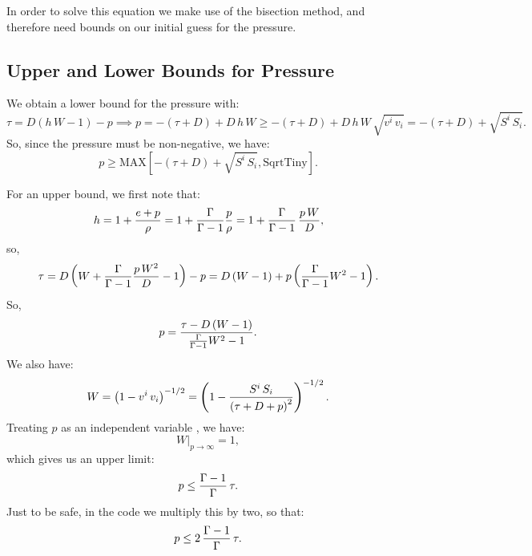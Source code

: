 \documentclass[10pt,preprint]{aastex}
\begin{document}
In order to solve this equation we make use of the bisection method, and therefore need bounds on our initial guess for the pressure.

\subsection{Upper and Lower Bounds for Pressure}
We obtain a lower bound for the pressure with:
\begin{equation}
\tau=D\left(h\,W-1\right)-p\implies p=-\left(\tau+D\right)+D\,h\,W\geq-\left(\tau+D\right)+D\,h\,W\,\sqrt{v^{i}\,v_{i}}=-\left(\tau+D\right)+\sqrt{S^{i}\,S_{i}}.
\end{equation}
So, since the pressure must be non-negative, we have:
\begin{equation}
p\geq\text{MAX}\left[-\left(\tau+D\right)+\sqrt{S^{i}\,S_{i}},\text{SqrtTiny}\right].
\end{equation}

For an upper bound, we first note that:
\begin{equation}
h=1+\frac{e+p}{\rho}=1+\frac{\Gamma}{\Gamma-1}\frac{p}{\rho}=1+\frac{\Gamma}{\Gamma-1}\,\frac{p\,W}{D},
\end{equation}
so,
\begin{equation}
\tau=D\left(W+\frac{\Gamma}{\Gamma-1}\frac{p\,W^{2}}{D}-1\right)-p=D\left(W-1\right)+p\left(\frac{\Gamma}{\Gamma-1}W^{2}-1\right).
\end{equation}
So,
\begin{equation}
p=\frac{\tau-D\left(W-1\right)}{\frac{\Gamma}{\Gamma-1}W^{2}-1}.
\end{equation}
We also have:
\begin{equation}
W=\left(1-v^{i}\,v_{i}\right)^{-1/2}=\left(1-\frac{S^{i}\,S_{i}}{\left(\tau+D+p\right)^{2}}\right)^{-1/2}.
\end{equation}
Treating $p$ as an independent variable , we have:
\begin{equation}
W\Big|_{p\rightarrow\infty}=1,
\end{equation}
which gives us an upper limit:
\begin{equation}
p\leq\frac{\Gamma-1}{\Gamma}\,\tau.
\end{equation}
Just to be safe, in the code we multiply this by two, so that:
\begin{equation}
p\leq2\,\frac{\Gamma-1}{\Gamma}\,\tau.
\end{equation}

\newpage







\end{document}
